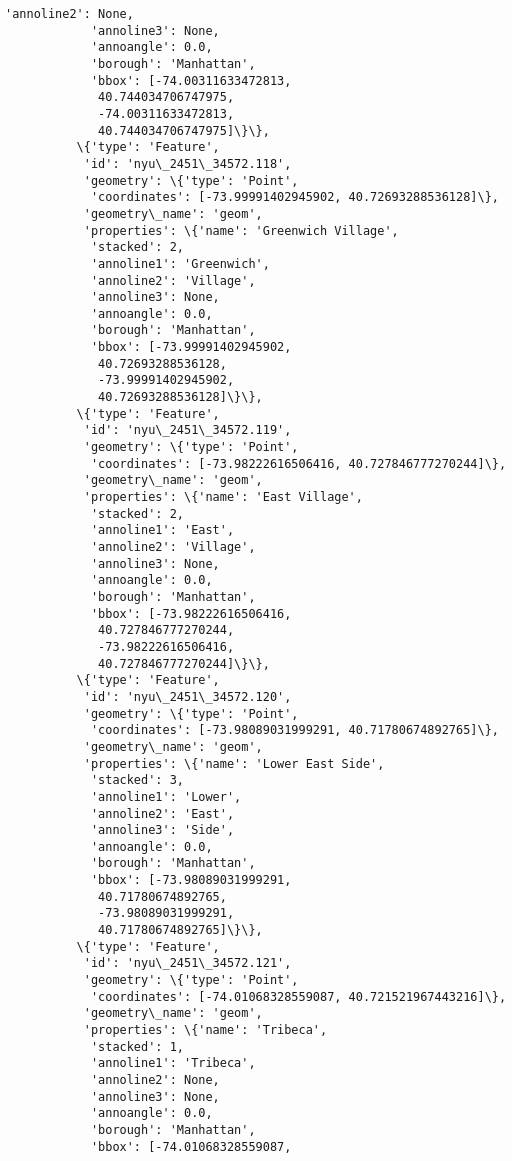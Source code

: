 \documentclass[11pt]{article}
\begin{document}
\begin{Verbatim}[commandchars=\\\{\}]
            'annoline2': None,
            'annoline3': None,
            'annoangle': 0.0,
            'borough': 'Manhattan',
            'bbox': [-74.00311633472813,
             40.744034706747975,
             -74.00311633472813,
             40.744034706747975]\}\},
          \{'type': 'Feature',
           'id': 'nyu\_2451\_34572.118',
           'geometry': \{'type': 'Point',
            'coordinates': [-73.99991402945902, 40.72693288536128]\},
           'geometry\_name': 'geom',
           'properties': \{'name': 'Greenwich Village',
            'stacked': 2,
            'annoline1': 'Greenwich',
            'annoline2': 'Village',
            'annoline3': None,
            'annoangle': 0.0,
            'borough': 'Manhattan',
            'bbox': [-73.99991402945902,
             40.72693288536128,
             -73.99991402945902,
             40.72693288536128]\}\},
          \{'type': 'Feature',
           'id': 'nyu\_2451\_34572.119',
           'geometry': \{'type': 'Point',
            'coordinates': [-73.98222616506416, 40.727846777270244]\},
           'geometry\_name': 'geom',
           'properties': \{'name': 'East Village',
            'stacked': 2,
            'annoline1': 'East',
            'annoline2': 'Village',
            'annoline3': None,
            'annoangle': 0.0,
            'borough': 'Manhattan',
            'bbox': [-73.98222616506416,
             40.727846777270244,
             -73.98222616506416,
             40.727846777270244]\}\},
          \{'type': 'Feature',
           'id': 'nyu\_2451\_34572.120',
           'geometry': \{'type': 'Point',
            'coordinates': [-73.98089031999291, 40.71780674892765]\},
           'geometry\_name': 'geom',
           'properties': \{'name': 'Lower East Side',
            'stacked': 3,
            'annoline1': 'Lower',
            'annoline2': 'East',
            'annoline3': 'Side',
            'annoangle': 0.0,
            'borough': 'Manhattan',
            'bbox': [-73.98089031999291,
             40.71780674892765,
             -73.98089031999291,
             40.71780674892765]\}\},
          \{'type': 'Feature',
           'id': 'nyu\_2451\_34572.121',
           'geometry': \{'type': 'Point',
            'coordinates': [-74.01068328559087, 40.721521967443216]\},
           'geometry\_name': 'geom',
           'properties': \{'name': 'Tribeca',
            'stacked': 1,
            'annoline1': 'Tribeca',
            'annoline2': None,
            'annoline3': None,
            'annoangle': 0.0,
            'borough': 'Manhattan',
            'bbox': [-74.01068328559087,

\end{Verbatim}
\end{document}
